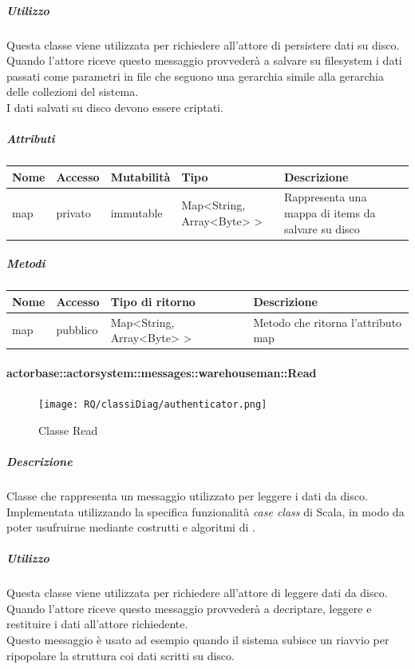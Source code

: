 \documentclass{scalatekids-article}
\begin{document}
\subparagraph{Utilizzo}
Questa classe viene utilizzata per richiedere all'attore di persistere dati
su disco. Quando l'attore riceve questo messaggio provvederà a salvare su
filesystem i dati passati come parametri in file che seguono una gerarchia
simile alla gerarchia delle collezioni del sistema.\\I dati salvati su disco
devono essere criptati.

\subparagraph{Attributi}
\begin{tabular}{| p{2cm} | p{1.5cm} | p{2cm} | p{3cm} | p{8.5cm} |}
  \hline
  Nome & Accesso & Mutabilità & Tipo & Descrizione\\
  \hline
  map & privato & immutable & Map<String, Array<Byte> > & Rappresenta una mappa di items da salvare su disco\\
  \hline
\end{tabular}

\subparagraph{Metodi}
\begin{tabular}{| l | l | l | l |}
  \hline
  Nome & Accesso & Tipo di ritorno & Descrizione\\
  \hline
  map & pubblico & Map<String, Array<Byte> > & Metodo che ritorna l'attributo map\\
  \hline
\end{tabular}

\paragraph{actorbase::actorsystem::messages::warehouseman::Read}
\label{sec:actorbase::actorsystem::messages::warehouseman::Read}

\begin{figure}[H]
  \begin{center}
    \texttt{[image: RQ/classiDiag/authenticator.png]}
    \caption{Classe Read}
  \end{center}
\end{figure}

\subparagraph{Descrizione}
Classe che rappresenta un messaggio utilizzato per leggere i dati da disco.\\Implementata utilizzando la specifica funzionalità \textit{case class} di Scala,
in modo da poter usufruirne mediante costrutti e algoritmi di
.

\subparagraph{Utilizzo}
Questa classe viene utilizzata per richiedere all'attore di leggere dati
da disco. Quando l'attore riceve questo messaggio provvederà a decriptare,
leggere e restituire i dati all'attore richiedente.\\Questo messaggio è usato ad esempio quando il sistema subisce un riavvio per ripopolare la struttura coi dati scritti su disco.
\end{document}

